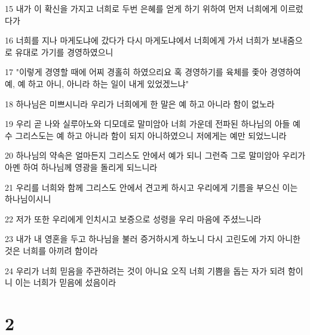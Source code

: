 \par 15 내가 이 확신을 가지고 너희로 두번 은혜를 얻게 하기 위하여 먼저 너희에게 이르렀다가
\par 16 너희를 지나 마게도냐에 갔다가 다시 마게도냐에서 너희에게 가서 너희가 보내줌으로 유대로 가기를 경영하였으니
\par 17 "이렇게 경영할 때에 어찌 경홀히 하였으리요 혹 경영하기를 육체를 좇아 경영하여 예, 예 하고 아니, 아니라 하는 일이 내게 있었겠느냐"
\par 18 하나님은 미쁘시니라 우리가 너희에게 한 말은 예 하고 아니라 함이 없노라
\par 19 우리 곧 나와 실루아노와 디모데로 말미암아 너희 가운데 전파된 하나님의 아들 예수 그리스도는 예 하고 아니라 함이 되지 아니하였으니 저에게는 예만 되었느니라
\par 20 하나님의 약속은 얼마든지 그리스도 안에서 예가 되니 그런즉 그로 말미암아 우리가 아멘 하여 하나님께 영광을 돌리게 되느니라
\par 21 우리를 너희와 함께 그리스도 안에서 견고케 하시고 우리에게 기름을 부으신 이는 하나님이시니
\par 22 저가 또한 우리에게 인치시고 보증으로 성령을 우리 마음에 주셨느니라
\par 23 내가 내 영혼을 두고 하나님을 불러 증거하시게 하노니 다시 고린도에 가지 아니한 것은 너희를 아끼려 함이라
\par 24 우리가 너희 믿음을 주관하려는 것이 아니요 오직 너희 기쁨을 돕는 자가 되려 함이니 이는 너희가 믿음에 섰음이라

\chapter{2}

